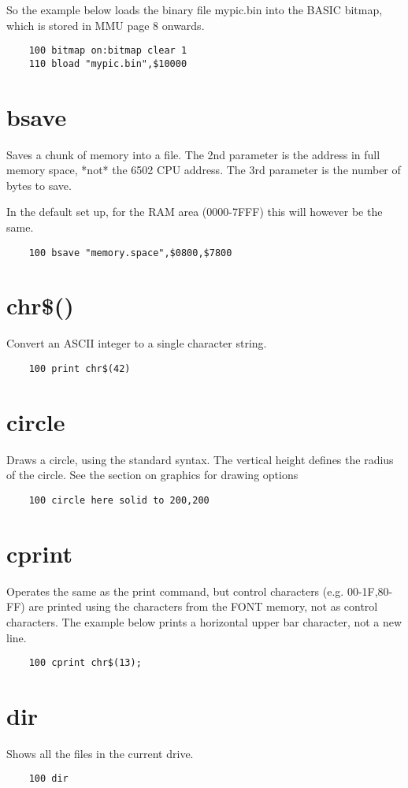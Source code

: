 So the example below loads the binary file mypic.bin into the BASIC bitmap, which is stored in MMU page 8 onwards.
\example{}
\begin{verbatim}
	100 bitmap on:bitmap clear 1
	110 bload "mypic.bin",$10000
\end{verbatim}

\section*{bsave}
Saves a chunk of memory into a file. The 2nd parameter is the address in full memory space, *not* the 6502 CPU address. The 3rd parameter is the number of bytes to save.

In the default set up, for the RAM area (0000-7FFF) this will however be the same.

\example{}
\begin{verbatim}
	100 bsave "memory.space",$0800,$7800
\end{verbatim}

\section*{chr\$()}
Convert an ASCII integer to a single character string.
\example{}
\begin{verbatim}
	100 print chr$(42)
\end{verbatim}

\section*{circle}
Draws a circle, using the standard syntax. The vertical height defines the radius of the circle. See the section on graphics for drawing options
\example{}
\begin{verbatim}
	100 circle here solid to 200,200
\end{verbatim}

\section*{cprint}
Operates the same as the print command, but control characters (e.g. 00-1F,80-FF) are printed using the characters from the FONT memory, not as control characters. The example below prints a horizontal upper bar character, not a new line.
\example{}
\begin{verbatim}
	100 cprint chr$(13);
\end{verbatim}

\section*{dir}
Shows all the files in the current drive.
\example{}
\begin{verbatim}
	100 dir
\end{verbatim}

